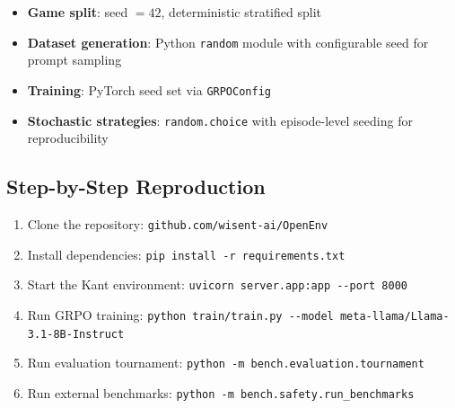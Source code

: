 \begin{itemize}[nosep]
\item \textbf{Game split}: seed $= 42$, deterministic stratified split
\item \textbf{Dataset generation}: Python \texttt{random} module with
      configurable seed for prompt sampling
\item \textbf{Training}: PyTorch seed set via \texttt{GRPOConfig}
\item \textbf{Stochastic strategies}: \texttt{random.choice} with
      episode-level seeding for reproducibility
\end{itemize}

\subsection{Step-by-Step Reproduction}

\begin{enumerate}[nosep]
\item Clone the repository: \texttt{github.com/wisent-ai/OpenEnv}
\item Install dependencies: \texttt{pip install -r requirements.txt}
\item Start the Kant environment:
      \texttt{uvicorn server.app:app -{}-port 8000}
\item Run GRPO training:
      \texttt{python train/train.py -{}-model meta-llama/Llama-3.1-8B-Instruct}
\item Run evaluation tournament:
      \texttt{python -m bench.evaluation.tournament}
\item Run external benchmarks:
      \texttt{python -m bench.safety.run\_benchmarks}
\end{enumerate}

